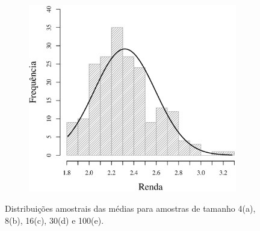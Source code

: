 \begin{figure}
\begin{subfigure}[b]{0.48\textwidth}
		\caption{}
		\label{fig:m30}
	\end{subfigure}
	\\
	\begin{subfigure}[b]{0.48\textwidth}
		\includegraphics[width=\textwidth]{plots/histogram_renda_n30.eps}
		\caption{}
		\label{fig:m30}
	\end{subfigure}
	\label{fig:distribuicao-amostral}
	\caption{Distribuições amostrais das médias para amostras de tamanho 4(a), 8(b), 16(c), 30(d) e 100(e).}
\end{figure}

\FloatBarrier
